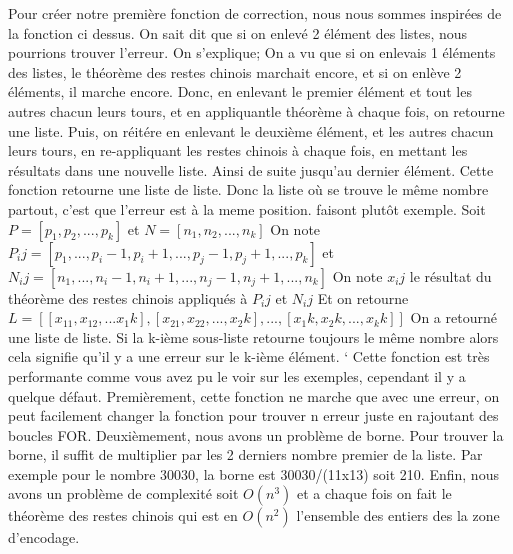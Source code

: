 \documentclass[a4paper, 11pt]{article}
\begin{document}
\newline 
\newline
Pour créer notre première fonction de correction, nous nous sommes inspirées de la fonction ci dessus. On sait dit que si on enlevé 2 élément des listes, nous pourrions trouver l'erreur. On s'explique;
On a vu que si on enlevais 1 éléments des listes, le théorème des restes chinois marchait encore, et si on enlève 2 éléments, il marche encore. Donc, en enlevant le premier élément et tout les autres chacun leurs
tours, et en appliquantle théorème à chaque fois, on retourne une liste. Puis, on réitére en enlevant le deuxième élément, et les autres chacun leurs tours, en re-appliquant les restes chinois à chaque fois, en mettant les résultats dans
une nouvelle liste. Ainsi de suite jusqu'au dernier élément. Cette fonction retourne une liste de liste. Donc la liste où se trouve le même nombre partout, c'est que l'erreur est à la meme position.
faisont plutôt exemple.
\newline
Soit $P=[p_1, p_2, ... , p_k]$ et $N=[n_1 , n_2, ... ,n_k]$ \newline
On note $P_ij =[p_1 , ... , p_i-1 , p_i+1 , ... , p_j-1 , p_j+1 , ... , p_k]$ et $N_ij=[n_1, ..., n_i-1, n_i+1, ..., n_j-1, n_j+1, ..., n_k]$ \newline
On note $x_ij$ le résultat du théorème des restes chinois appliqués à $P_ij$ et $N_ij$ \newline
Et on retourne $L=[[x_11,x_12,...x_1k],[x_21,x_22,...,x_2k],...,[x_1k,x_2k,...,x_kk]]$ \newline
On a retourné une liste de liste. Si la k-ième sous-liste retourne toujours le même nombre alors cela signifie qu'il y a une erreur sur le k-ième élément. \newline`
\newline
Cette fonction est très performante comme vous avez pu le voir sur les exemples, cependant il y a quelque défaut. Premièrement, cette fonction ne marche que avec une erreur,
on peut facilement changer la fonction pour trouver n erreur juste en rajoutant des boucles FOR. Deuxièmement, nous avons un problème de borne. Pour trouver la borne,
il suffit de multiplier par les 2 derniers nombre premier de la liste. \newline
Par exemple pour le nombre 30030, la borne est 30030/(11x13) soit 210.\newline
Enfin, nous avons un problème de complexité soit $O(n^3)$ et a chaque fois on fait le théorème des restes chinois qui est en $O(n^2)$  l'ensemble des entiers des la zone d'encodage.
\end{document}
